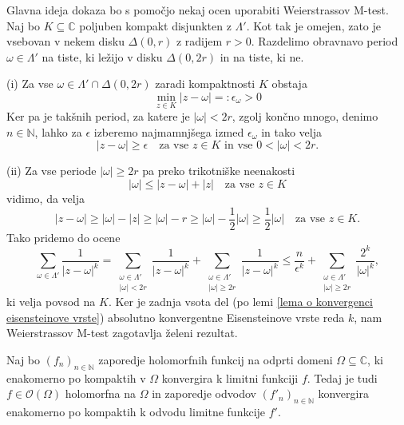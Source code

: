 \documentclass[mat1]{fmfdelo}
\newcommand{\N}{\mathbb N}
\newcommand{\C}{\mathbb C}
\newcommand{\om}{\omega}
\newcommand{\hol}[1]{\mathcal{O}(#1)}
\newcommand{\abs}[1]{\left\lvert #1 \right\rvert}
\theoremstyle{definition}
\begin{document}
\begin{dokaz}
    Glavna ideja dokaza bo s pomočjo nekaj ocen uporabiti Weierstrassov M-test. Naj bo $K \subseteq \C$ poljuben kompakt disjunkten z $\Lambda'$. Kot tak je omejen, zato je vsebovan v nekem disku $\Delta(0,r)$ z radijem $r > 0$. Razdelimo obravnavo period $\omega \in \Lambda'$ na tiste, ki ležijo v disku $\Delta(0,2r)$ in na tiste, ki ne.
    
    (i) Za vse $\omega \in \Lambda' \cap \Delta(0,2r)$ zaradi kompaktnosti $K$ obstaja
    \[
        \min_{z \in K} \abs{z - \omega} =: \epsilon_\omega > 0
    \]
    Ker pa je takšnih period, za katere je $\abs{\omega} < 2r$, zgolj končno mnogo, denimo $n \in \N$, lahko za $\epsilon$ izberemo najmamnjšega izmed $\epsilon_\om$ in tako velja 
    \[
        \abs{z - \omega} \geq \epsilon \quad \text{za vse $z \in K$ in vse $0 < \abs{\omega} < 2r$.}  
    \]
    
    (ii) Za vse periode $\abs{\omega} \geq 2r$ pa preko trikotniške neenakosti
    \[
        \abs{\om} \leq \abs{z - \om} + \abs{z} \quad \text{za vse $z \in K$}
    \]
    vidimo, da velja 
    \[
        \abs{z - \om} \geq 
        \abs{\om} - \abs{z} \geq 
        \abs{\om} - r \geq 
        \abs{\om} - \frac{1}{2}\abs{\om} \geq
        \frac{1}{2}\abs{\om} \quad \text{za vse $z\in K$.}
    \]
    Tako pridemo do ocene
    \[
        \sum_{\om \in \Lambda'} \frac{1}{\abs{z - \om}^k} = 
        \sum_{\substack{\om \in \Lambda' \\ \abs{\om} < 2r}} \frac{1}{\abs{z - \om}^k} + \sum_{\substack{\om \in \Lambda' \\ \abs{\om} \geq 2r}} \frac{1}{\abs{z - \om}^k} \leq
        \frac{n}{\epsilon^k} + \sum_{\substack{\om \in \Lambda' \\ \abs{\om} \geq 2r}} \frac{2^k}{\abs{\om}^k},
    \]
    ki velja povsod na $K$. Ker je zadnja vsota del (po lemi \ref{lema o konvergenci eisensteinove vrste}) absolutno konvergentne Eisensteinove vrste reda $k$, nam Weierstrassov M-test zagotavlja želeni rezultat.
\end{dokaz}

\begin{izrek}
    \label{izrek o konvergenci holomorfnih funkcij}
    Naj bo $(f_n)_{n \in \N}$ zaporedje holomorfnih funkcij na odprti domeni $\Omega \subseteq \C$, ki enakomerno po kompaktih v $\Omega$ konvergira k limitni funkciji $f$. Tedaj je tudi $f \in \hol{\Omega}$ holomorfna na $\Omega$ in zaporedje odvodov $(f'_n)_{n\in \N}$ konvergira enakomerno po kompaktih k odvodu limitne funkcije $f'$.
\end{izrek}
\end{document}
